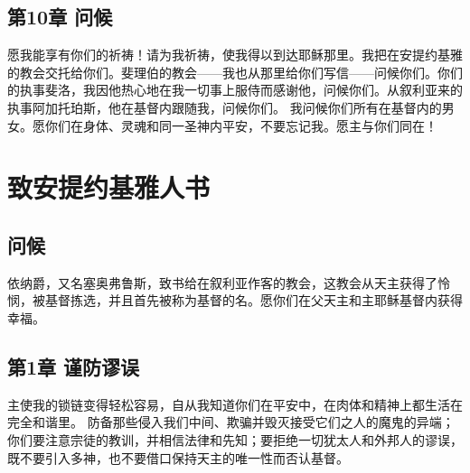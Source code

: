 
\subsection{第10章  问候}

愿我能享有你们的祈祷！请为我祈祷，使我得以到达耶稣那里。我把在安提约基雅的教会交托给你们。斐理伯的教会——我也从那里给你们写信——问候你们。你们的执事斐洛，我因他热心地在我一切事上服侍而感谢他，问候你们。从叙利亚来的执事阿加托珀斯，他在基督内跟随我，问候你们。  \newline{} 我问候你们所有在基督内的男女。愿你们在身体、灵魂和同一圣神内平安，不要忘记我。愿主与你们同在！\par


\section{致安提约基雅人书}


\subsection{问候}

依纳爵，又名塞奥弗鲁斯，致书给在叙利亚作客的教会，这教会从天主获得了怜悯，被基督拣选，并且首先被称为基督的名。愿你们在父天主和主耶稣基督内获得幸福。\par


\subsection{第1章  谨防谬误}

主使我的锁链变得轻松容易，自从我知道你们在平安中，在肉体和精神上都生活在完全和谐里。  \newline{} 防备那些侵入我们中间、欺骗并毁灭接受它们之人的魔鬼的异端；你们要注意宗徒的教训，并相信法律和先知；要拒绝一切犹太人和外邦人的谬误，既不要引入多神，也不要借口保持天主的唯一性而否认基督。\par

